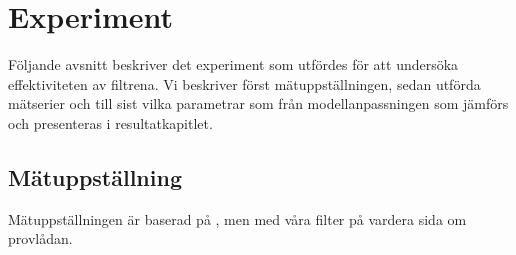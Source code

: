 \documentclass[main.tex]{subfiles}
\begin{document}
\chapter{Experiment}
\label{ch:exp}
Följande avsnitt beskriver det experiment som utfördes för att undersöka effektiviteten av filtrena. Vi beskriver först mätuppställningen, sedan utförda mätserier och till sist vilka parametrar som från modellanpassningen som jämförs och presenteras i resultatkapitlet.



\section{Mätuppställning}
Mätuppställningen är baserad på , men med våra filter på vardera sida om provlådan.

\end{document}
